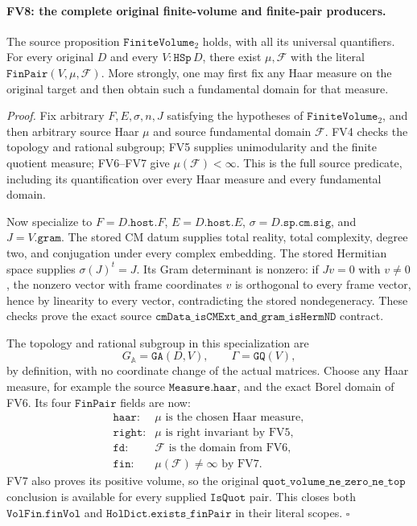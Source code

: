 \paragraph{FV8: the complete original finite-volume and finite-pair producers.}
\label{claim:FV8}
The source proposition \(\texttt{FiniteVolume}_2\) holds, with all
its universal quantifiers.  For every original \(D\) and every
\(V:\texttt{HSp}\,D\), there exist \(\mu,\mathcal F\) with the literal
\(\texttt{FinPair}(V,\mu,\mathcal F)\).  More strongly, one may first
fix any Haar measure on the original target and then obtain such
a fundamental domain for that measure.

\emph{Proof.}
Fix arbitrary \(F,E,\sigma,n,J\) satisfying the hypotheses of
\(\texttt{FiniteVolume}_2\), and then arbitrary source Haar
\(\mu\) and source fundamental domain \(\mathcal F\).
FV4 checks the topology and rational subgroup; FV5 supplies
unimodularity and the finite quotient measure; FV6--FV7 give
\(\mu(\mathcal F)<\infty\).  This is the full source predicate,
including its quantification over every Haar measure and every
fundamental domain.

Now specialize to \(F=D.\texttt{host}.F\),
\(E=D.\texttt{host}.E\), \(\sigma=D.\texttt{sp.cm.sig}\), and
\(J=V.\texttt{gram}\).  The stored CM datum supplies total reality,
total complexity, degree two, and conjugation under every complex
embedding.  The stored Hermitian space supplies
\(\sigma(J)^t=J\).  Its Gram determinant is nonzero: if \(Jv=0\)
with \(v\ne0\), the nonzero vector with frame coordinates \(v\)
is orthogonal to every frame vector, hence by linearity to every
vector, contradicting the stored nondegeneracy.  These checks prove
the exact source
\(\texttt{cmData\_isCMExt\_and\_gram\_isHermND}\) contract.

The topology and rational subgroup in this specialization are
\[
 G_{\mathbb A}=\texttt{GA}(D,V),\qquad
 \Gamma=\texttt{GQ}(V),
 \tag{FV.17}
\]
by definition, with no coordinate change of the actual matrices.
Choose any Haar measure, for example the source
\(\texttt{Measure.haar}\), and the exact Borel domain of FV6.
Its four \(\texttt{FinPair}\) fields are now:
\[
 \begin{array}{ll}
 \texttt{haar}:&\mu\text{ is the chosen Haar measure},\\
 \texttt{right}:&\mu\text{ is right invariant by FV5},\\
 \texttt{fd}:&\mathcal F\text{ is the domain from FV6},\\
 \texttt{fin}:&\mu(\mathcal F)\ne\infty\text{ by FV7}.
 \end{array}
 \tag{FV.18}
\]
FV7 also proves its positive volume, so the original
\(\texttt{quot\_volume\_}\allowbreak
  \texttt{ne\_zero\_ne\_top}\) conclusion is available
for every supplied \(\texttt{IsQuot}\) pair.  This closes both
\(\texttt{VolFin.finVol}\) and
\(\texttt{HolDict.}\allowbreak\texttt{exists\_finPair}\)
in their literal scopes. \(\square\)

